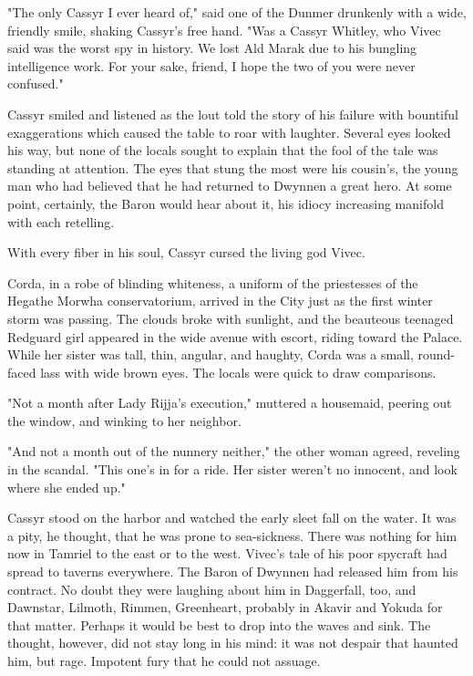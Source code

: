 "The only Cassyr I ever heard of," said one of the Dunmer drunkenly with a wide, friendly smile, shaking Cassyr's free hand. "Was a Cassyr Whitley, who Vivec said was the worst spy in history. We lost Ald Marak due to his bungling intelligence work. For your sake, friend, I hope the two of you were never confused."

Cassyr smiled and listened as the lout told the story of his failure with bountiful exaggerations which caused the table to roar with laughter. Several eyes looked his way, but none of the locals sought to explain that the fool of the tale was standing at attention. The eyes that stung the most were his cousin's, the young man who had believed that he had returned to Dwynnen a great hero. At some point, certainly, the Baron would hear about it, his idiocy increasing manifold with each retelling.

With every fiber in his soul, Cassyr cursed the living god Vivec.

Corda, in a robe of blinding whiteness, a uniform of the priestesses of the Hegathe Morwha conservatorium, arrived in the City just as the first winter storm was passing. The clouds broke with sunlight, and the beauteous teenaged Redguard girl appeared in the wide avenue with escort, riding toward the Palace. While her sister was tall, thin, angular, and haughty, Corda was a small, round-faced lass with wide brown eyes. The locals were quick to draw comparisons.

"Not a month after Lady Rijja's execution," muttered a housemaid, peering out the window, and winking to her neighbor.

"And not a month out of the nunnery neither," the other woman agreed, reveling in the scandal. "This one's in for a ride. Her sister weren't no innocent, and look where she ended up."

Cassyr stood on the harbor and watched the early sleet fall on the water. It was a pity, he thought, that he was prone to sea-sickness. There was nothing for him now in Tamriel to the east or to the west. Vivec's tale of his poor spycraft had spread to taverns everywhere. The Baron of Dwynnen had released him from his contract. No doubt they were laughing about him in Daggerfall, too, and Dawnstar, Lilmoth, Rimmen, Greenheart, probably in Akavir and Yokuda for that matter. Perhaps it would be best to drop into the waves and sink. The thought, however, did not stay long in his mind: it was not despair that haunted him, but rage. Impotent fury that he could not assuage.

